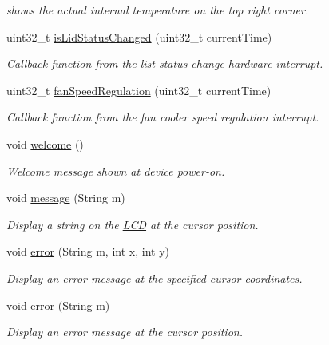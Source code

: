 \begin{DoxyCompactItemize}
\begin{DoxyCompactList}\small\item\em shows the actual internal temperature on the top right corner. \end{DoxyCompactList}\item 
uint32\-\_\-t \hyperlink{_meditech___chip_kit_control_panel_8pde_a9cb6bd9c7a705cdd913780d7adef7bb4}{is\-Lid\-Status\-Changed} (uint32\-\_\-t current\-Time)
\begin{DoxyCompactList}\small\item\em Callback function from the list status change hardware interrupt. \end{DoxyCompactList}\item 
uint32\-\_\-t \hyperlink{_meditech___chip_kit_control_panel_8pde_a16768141866f1d78608528f2867aeab4}{fan\-Speed\-Regulation} (uint32\-\_\-t current\-Time)
\begin{DoxyCompactList}\small\item\em Callback function from the fan cooler speed regulation interrupt. \end{DoxyCompactList}\item 
void \hyperlink{_meditech___chip_kit_control_panel_8pde_a236e454e493fc9b262f746305660a2eb}{welcome} ()
\begin{DoxyCompactList}\small\item\em Welcome message shown at device power-\/on. \end{DoxyCompactList}\item 
void \hyperlink{_meditech___chip_kit_control_panel_8pde_a6144e628c9b27d96d525aac6746e6461}{message} (String m)
\begin{DoxyCompactList}\small\item\em Display a string on the \hyperlink{class_l_c_d}{L\-C\-D} at the cursor position. \end{DoxyCompactList}\item 
void \hyperlink{_meditech___chip_kit_control_panel_8pde_a5abae2c246607db092b33a647206b932}{error} (String m, int x, int y)
\begin{DoxyCompactList}\small\item\em Display an error message at the specified cursor coordinates. \end{DoxyCompactList}\item 
void \hyperlink{_meditech___chip_kit_control_panel_8pde_a6cce144e7c040f9016e8bd1be2a412c5}{error} (String m)
\begin{DoxyCompactList}\small\item\em Display an error message at the cursor position. \end{DoxyCompactList}\item 

\end{DoxyCompactItemize}
